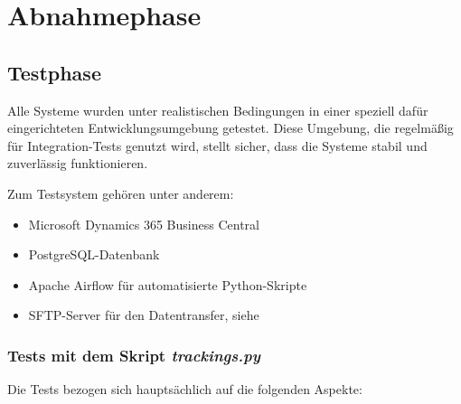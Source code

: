 \section{Abnahmephase}
\label{sec:Abnahmephase}

\subsection{Testphase}
\label{sec:Testphase}
Alle Systeme wurden unter realistischen Bedingungen in einer speziell dafür eingerichteten Entwicklungsumgebung getestet.
Diese Umgebung, die regelmäßig für Integration-Tests genutzt wird, stellt sicher, dass die Systeme stabil und
zuverlässig funktionieren.

Zum Testsystem gehören unter anderem:

\begin{itemize}
	\item Microsoft Dynamics 365 Business Central
	\item PostgreSQL-Datenbank 
	\item Apache Airflow für automatisierte Python-Skripte 
	\item SFTP-Server für den Datentransfer, siehe 
\end{itemize}

\subsubsection{Tests mit dem Skript \textit{trackings.py}}
\label{sec:Tests mit dem Skript trackings.py}

Die Tests bezogen sich hauptsächlich auf die folgenden Aspekte:

